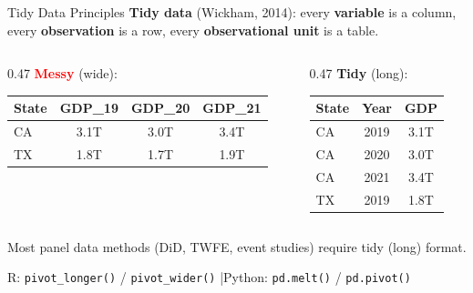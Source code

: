 \begin{frame}{Tidy Data Principles}
  \small
  \textbf{Tidy data} (Wickham, 2014): every \textbf{variable} is a column, every \textbf{observation} is a row, every \textbf{observational unit} is a table.

  \vspace{6pt}

  \begin{columns}[T]
    \begin{column}{0.47\textwidth}
      \textbf{\textcolor{red}{Messy}} (wide):

      \vspace{4pt}

      \footnotesize
      \begin{tabular}{@{}lccc@{}}
        \toprule
        State & GDP\_19 & GDP\_20 & GDP\_21 \\
        \midrule
        CA & 3.1T & 3.0T & 3.4T \\
        TX & 1.8T & 1.7T & 1.9T \\
        \bottomrule
      \end{tabular}
    \end{column}
    \begin{column}{0.47\textwidth}
      \textbf{\textcolor{usfgreen}{Tidy}} (long):

      \vspace{4pt}

      \footnotesize
      \begin{tabular}{@{}lcc@{}}
        \toprule
        State & Year & GDP \\
        \midrule
        CA & 2019 & 3.1T \\
        CA & 2020 & 3.0T \\
        CA & 2021 & 3.4T \\
        TX & 2019 & 1.8T \\
        \bottomrule
      \end{tabular}
    \end{column}
  \end{columns}

  \vspace{6pt}

  \normalsize
  Most panel data methods (DiD, TWFE, event studies) require tidy (long) format.

  \vspace{2pt}

  R: \texttt{pivot\_longer()} / \texttt{pivot\_wider()} \quad|\quad Python: \texttt{pd.melt()} / \texttt{pd.pivot()}
\end{frame}

